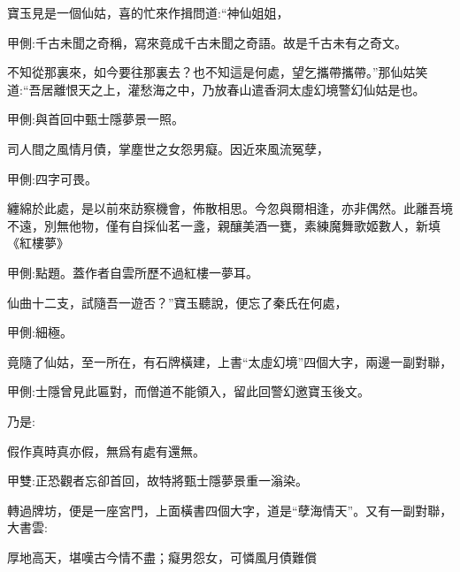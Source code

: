 \begin{parag}
    寶玉見是一個仙姑，喜的忙來作揖問道:“神仙姐姐，\begin{note}甲側:千古未聞之奇稱，寫來竟成千古未聞之奇語。故是千古未有之奇文。\end{note}不知從那裏來，如今要往那裏去？也不知這是何處，望乞攜帶攜帶。”那仙姑笑道:“吾居離恨天之上，灌愁海之中，乃放春山遣香洞太虛幻境警幻仙姑是也。\begin{note}甲側:與首回中甄士隱夢景一照。\end{note}司人間之風情月債，掌塵世之女怨男癡。因近來風流冤孽，\begin{note}甲側:四字可畏。\end{note}纏綿於此處，是以前來訪察機會，佈散相思。今忽與爾相逢，亦非偶然。此離吾境不遠，別無他物，僅有自採仙茗一盞，親釀美酒一甕，素練魔舞歌姬數人，新填《紅樓夢》\begin{note}甲側:點題。蓋作者自雲所歷不過紅樓一夢耳。\end{note}仙曲十二支，試隨吾一遊否？”寶玉聽說，便忘了秦氏在何處，\begin{note}甲側:細極。\end{note}竟隨了仙姑，至一所在，有石牌橫建，上書“太虛幻境”四個大字，兩邊一副對聯，\begin{note}甲側:士隱曾見此匾對，而僧道不能領入，留此回警幻邀寶玉後文。\end{note}乃是:
\end{parag}


\begin{poem}
    \begin{pl}假作真時真亦假，無爲有處有還無。\end{pl}\begin{note}甲雙:正恐觀者忘卻首回，故特將甄士隱夢景重一滃染。\end{note}
\end{poem}


\begin{parag}
    轉過牌坊，便是一座宮門，上面橫書四個大字，道是“孽海情天”。又有一副對聯，大書雲:
\end{parag}


\begin{poem}
    \begin{pl}厚地高天，堪嘆古今情不盡；癡男怨女，可憐風月債難償\end{pl}
\end{poem}


